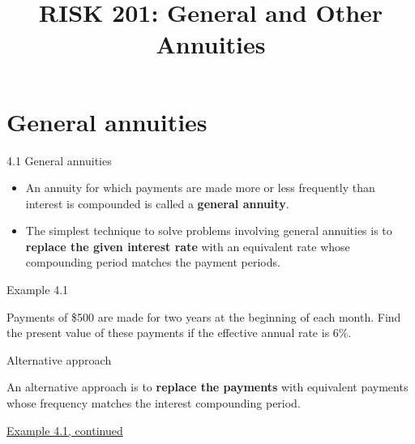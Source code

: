 \documentclass{beamer}
\title{RISK 201: General and Other Annuities}
\begin{document}
\maketitle

\section{General annuities}

\begin{frame}{4.1 General annuities}

\begin{itemize}
\item An annuity for which payments are made more or less frequently than interest is compounded is called a \textbf{general annuity}.
\bigskip
\item The simplest technique to solve problems involving general annuities is to \textbf{replace the given interest rate} with an equivalent rate whose compounding period matches the payment periods.
\end{itemize}

\end{frame}

\begin{frame}{Example 4.1}

Payments of \$500 are made for two years at the beginning of each month. Find the present value of these payments if the effective annual rate is 6\%.

\bigskip
\begin{center}
\end{center}

\vfill
\end{frame}

\begin{frame}{Alternative approach}

An alternative approach is to \textbf{replace the payments} with equivalent payments whose frequency matches the interest compounding period.

\bigskip
\underline{Example 4.1, continued}

\bigskip
\begin{center}
\end{center}

\vfill
\end{frame}
\end{document}
